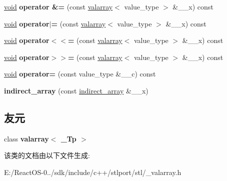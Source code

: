 \begin{DoxyCompactItemize}
\mbox{\label{classindirect__array_a307e9a35607f6381e95cf670dd978b58}} 
\hyperlink{interfacevoid}{void} {\bfseries operator \&=} (const \hyperlink{classvalarray}{valarray}$<$ value\+\_\+type $>$ \&\+\_\+\+\_\+x) const
\item 
\mbox{\label{classindirect__array_a72862874ac2d19ee6292f52300e2ed8d}} 
\hyperlink{interfacevoid}{void} {\bfseries operator$\vert$=} (const \hyperlink{classvalarray}{valarray}$<$ value\+\_\+type $>$ \&\+\_\+\+\_\+x) const
\item 
\mbox{\label{classindirect__array_a6a99a36db8e052312c53105cdb23cd0a}} 
\hyperlink{interfacevoid}{void} {\bfseries operator$<$$<$=} (const \hyperlink{classvalarray}{valarray}$<$ value\+\_\+type $>$ \&\+\_\+\+\_\+x) const
\item 
\mbox{\label{classindirect__array_ae18019e6000f8d56e1289550fe9a4242}} 
\hyperlink{interfacevoid}{void} {\bfseries operator$>$$>$=} (const \hyperlink{classvalarray}{valarray}$<$ value\+\_\+type $>$ \&\+\_\+\+\_\+x) const
\item 
\mbox{\label{classindirect__array_abd75883c58f4631c1e57d2a115d222e5}} 
\hyperlink{interfacevoid}{void} {\bfseries operator=} (const value\+\_\+type \&\+\_\+\+\_\+c) const
\item 
\mbox{\label{classindirect__array_a64dd686909fc787bb539dca9c68eb529}} 
{\bfseries indirect\+\_\+array} (const \hyperlink{classindirect__array}{indirect\+\_\+array} \&\+\_\+\+\_\+x)
\end{DoxyCompactItemize}
\subsection*{友元}
\begin{DoxyCompactItemize}
\item 
\mbox{\label{classindirect__array_a0d82c6ffc3aec42e2ffa8d69cd3f0945}} 
class {\bfseries valarray$<$ \+\_\+\+Tp $>$}
\end{DoxyCompactItemize}


该类的文档由以下文件生成\+:\begin{DoxyCompactItemize}
\item 
E\+:/\+React\+O\+S-\/0../sdk/include/c++/stlport/stl/\+\_\+valarray.\+h\end{DoxyCompactItemize}
